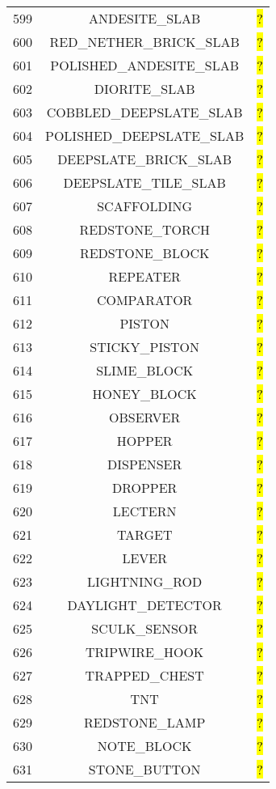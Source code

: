 \documentclass[11pt]{article}
\newcommand\myworries[1]{\sethlcolor{red}\hl{#1}}
\begin{document}
\begin{longtable}{ |c|c|c| }
	599 & ANDESITE\_SLAB & \myworries{?} \\
	600 & RED\_NETHER\_BRICK\_SLAB & \myworries{?} \\
	601 & POLISHED\_ANDESITE\_SLAB & \myworries{?} \\
	602 & DIORITE\_SLAB & \myworries{?} \\
	603 & COBBLED\_DEEPSLATE\_SLAB & \myworries{?} \\
	604 & POLISHED\_DEEPSLATE\_SLAB & \myworries{?} \\
	605 & DEEPSLATE\_BRICK\_SLAB & \myworries{?} \\
	606 & DEEPSLATE\_TILE\_SLAB & \myworries{?} \\
	607 & SCAFFOLDING & \myworries{?} \\
	608 & REDSTONE\_TORCH & \myworries{?} \\
	609 & REDSTONE\_BLOCK & \myworries{?} \\
	610 & REPEATER & \myworries{?} \\
	611 & COMPARATOR & \myworries{?} \\
	612 & PISTON & \myworries{?} \\
	613 & STICKY\_PISTON & \myworries{?} \\
	614 & SLIME\_BLOCK & \myworries{?} \\
	615 & HONEY\_BLOCK & \myworries{?} \\
	616 & OBSERVER & \myworries{?} \\
	617 & HOPPER & \myworries{?} \\
	618 & DISPENSER & \myworries{?} \\
	619 & DROPPER & \myworries{?} \\
	620 & LECTERN & \myworries{?} \\
	621 & TARGET & \myworries{?} \\
	622 & LEVER & \myworries{?} \\
	623 & LIGHTNING\_ROD & \myworries{?} \\
	624 & DAYLIGHT\_DETECTOR & \myworries{?} \\
	625 & SCULK\_SENSOR & \myworries{?} \\
	626 & TRIPWIRE\_HOOK & \myworries{?} \\
	627 & TRAPPED\_CHEST & \myworries{?} \\
	628 & TNT & \myworries{?} \\
	629 & REDSTONE\_LAMP & \myworries{?} \\
	630 & NOTE\_BLOCK & \myworries{?} \\
	631 & STONE\_BUTTON & \myworries{?} \\

\end{longtable}
\end{document}
